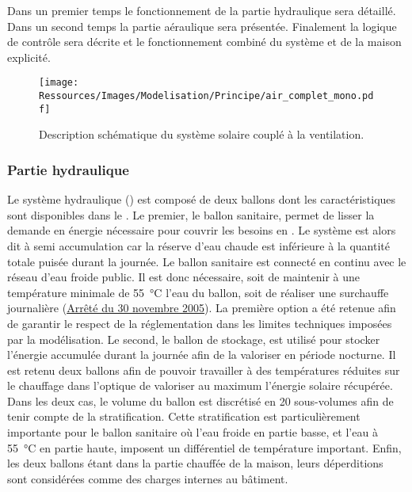 Dans un premier temps le fonctionnement de la partie hydraulique sera détaillé. Dans un
second temps la partie aéraulique sera présentée. Finalement la logique de contrôle sera
décrite et le fonctionnement combiné du système et de la maison explicité.

\begin{figure}
    \centering
    \texttt{[image: Ressources/Images/Modelisation/Principe/air\_complet\_mono.pdf]}
    \caption[escription schématique du système solaire couplé à la ventilation]
            {Description schématique du système solaire couplé à la ventilation.}
    \label{fig:air_complet_mono}
\end{figure}

\subsubsection{Partie hydraulique} %
\label{ssub:partie_hyraulique}
Le système hydraulique () est composé de deux ballons dont les
caractéristiques sont disponibles dans le . Le premier, le ballon
sanitaire, permet de lisser la demande en énergie nécessaire pour couvrir les besoins en
. Le système est alors dit à semi accumulation car la réserve d’eau chaude est inférieure
à la quantité totale puisée durant la journée. Le ballon sanitaire est connecté en
continu avec le réseau d’eau froide public. Il est donc nécessaire, soit de maintenir
à une température minimale de \SI{55}{\celsius} l’eau du ballon, soit de réaliser une surchauffe journalière
(\href{https://www.legifrance.gouv.fr/affichTexte.do?cidTexte=JORFTEXT000000423756}{Arrêté
du 30 novembre 2005}). La première option a été retenue afin de garantir le respect de la
réglementation dans les limites techniques imposées par la modélisation. Le second, le
ballon de stockage, est utilisé pour stocker l’énergie accumulée durant la journée afin de
la valoriser en période nocturne. Il est retenu deux ballons afin de pouvoir travailler
à des températures réduites sur le chauffage dans l’optique de valoriser au maximum
l’énergie solaire récupérée.
Dans les deux cas, le volume du ballon est discrétisé en
\num{20} sous-volumes afin de tenir compte de la stratification. Cette stratification est
particulièrement importante pour le ballon sanitaire où l’eau froide en partie basse, et
l’eau à \SI{55}{\celsius} en partie haute, imposent un différentiel de température
important. Enfin, les deux ballons étant dans la partie chauffée de la maison, leurs
déperditions sont considérées comme des charges internes au bâtiment.

